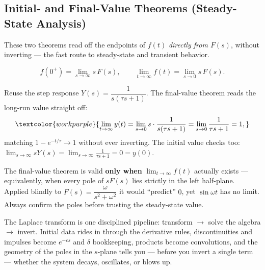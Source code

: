 \subsection{Initial- and Final-Value Theorems (Steady-State Analysis)}

These two theorems read off the endpoints of $f(t)$ \emph{directly from $F(s)$},
without inverting --- the fast route to steady-state and transient behavior.

\begin{formulabox}
\[ f(0^+) = \lim_{s\to\infty} s\,F(s), \qquad
   \lim_{t\to\infty} f(t) = \lim_{s\to 0} s\,F(s). \]
\end{formulabox}

\begin{examplebox}
Reuse the step response $Y(s) = \dfrac{1}{s(\tau s + 1)}$. The final-value theorem
reads the long-run value straight off:
\[ \textcolor{workpurple}{\lim_{t\to\infty} y(t) = \lim_{s\to 0} s\cdot
   \frac{1}{s(\tau s + 1)} = \lim_{s\to 0}\frac{1}{\tau s + 1} = 1,} \]
matching $1 - e^{-t/\tau}\to 1$ without ever inverting. The initial value checks too:
$\lim_{s\to\infty} sY(s) = \lim_{s\to\infty}\frac{1}{\tau s + 1} = 0 = y(0)$.
\end{examplebox}

\begin{warningbox}
The final-value theorem is valid \textbf{only when} $\lim_{t\to\infty}f(t)$ actually
exists --- equivalently, when every pole of $sF(s)$ lies strictly in the left
half-plane. Applied blindly to $F(s)=\dfrac{\omega}{s^2+\omega^2}$ it would
``predict'' $0$, yet $\sin\omega t$ has no limit. Always confirm the poles before
trusting the steady-state value.
\end{warningbox}

\begin{conceptbox}
The Laplace transform is one disciplined pipeline:
\textcolor{accentorange}{transform $\to$ solve the algebra $\to$ invert}. Initial
data rides in through the derivative rules, discontinuities and impulses become
$e^{-cs}$ and $\delta$ bookkeeping, products become convolutions, and the geometry of
the poles in the $s$-plane tells you --- before you invert a single term --- whether
the system decays, oscillates, or blows up.
\end{conceptbox}



